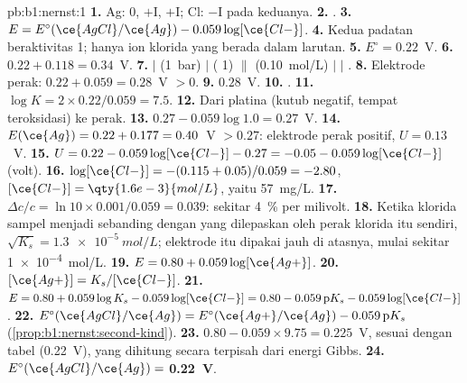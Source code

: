 \begin{solution}{pb:b1:nernst:1}
\textbf{1.} Ag: 0, $+$I, $+$I; Cl: $-$I pada keduanya.
\textbf{2.} .
\textbf{3.} $E = E^\circ(\ce{AgCl}/\ce{Ag}) - 0.059\log[\ce{Cl-}]$.
\textbf{4.} Kedua padatan beraktivitas 1; hanya ion klorida yang berada
dalam larutan.
\textbf{5.} $E^\circ = 0.22$~V.
\textbf{6.} $0.22 + 0.118 = 0.34$~V.
\textbf{7.}  $|$  (\qty{1}{bar}) $|$  ( 1)
$\|$  (\qty{0.10}{mol/L}) $|$  $|$ .
\textbf{8.} Elektrode perak: $0.22 + 0.059 = 0.28$~V $> 0$.
\textbf{9.} $0.28$~V.
\textbf{10.} .
\textbf{11.} $\log K = 2 \times 0.22/0.059 = 7.5$.
\textbf{12.} Dari platina (kutub negatif, tempat  teroksidasi) ke
perak.
\textbf{13.} $0.27 - 0.059\log 1.0 = 0.27$~V.
\textbf{14.} $E(\ce{Ag}) = 0.22 + 0.177 = 0.40$~V $> 0.27$: elektrode
perak positif, $U = 0.13$~V.
\textbf{15.} $U = 0.22 - 0.059\log[\ce{Cl-}] - 0.27 = -0.05 -
0.059\log[\ce{Cl-}]$ (volt).
\textbf{16.} $\log[\ce{Cl-}] = -(0.115 + 0.05)/0.059 = -2.80$,
$[\ce{Cl-}] = \qty{1.6e-3}{mol/L}$, yaitu \qty{57}{mg/L}.
\textbf{17.} $\Delta c/c = \ln 10 \times 0.001/0.059 = 0.039$: sekitar
\qty{4}{\percent} per milivolt.
\textbf{18.} Ketika klorida sampel menjadi sebanding dengan yang
dilepaskan oleh perak klorida itu sendiri, $\sqrt{K_s} = \qty{1.3e-5}{mol/L}$;
elektrode itu dipakai jauh di atasnya, mulai sekitar \qty{1e-4}{mol/L}.
\textbf{19.} $E = 0.80 + 0.059\log[\ce{Ag+}]$.
\textbf{20.} $[\ce{Ag+}] = K_s/[\ce{Cl-}]$.
\textbf{21.} $E = 0.80 + 0.059\log K_s - 0.059\log[\ce{Cl-}] = 0.80 -
0.059\,\mathrm{p}K_s - 0.059\log[\ce{Cl-}]$.
\textbf{22.} $E^\circ(\ce{AgCl}/\ce{Ag}) = E^\circ(\ce{Ag+}/\ce{Ag}) -
0.059\,\mathrm{p}K_s$ (\cref{prop:b1:nernst:second-kind}).
\textbf{23.} $0.80 - 0.059 \times 9.75 = 0.225$~V, sesuai dengan tabel
(0.22~V), yang dihitung secara terpisah dari energi Gibbs.
\textbf{24.} $E^\circ(\ce{AgCl}/\ce{Ag}) = $ \textbf{0.22~V}.
\end{solution}
